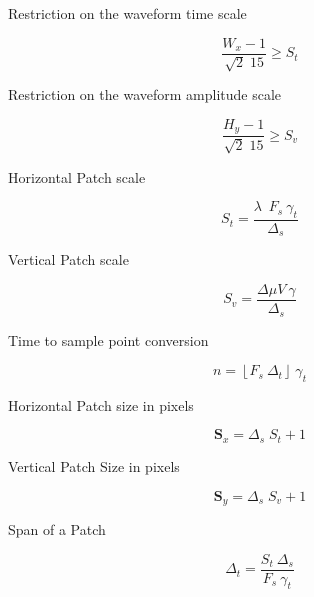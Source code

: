 Restriction on the waveform time scale

\begin{equation}
\frac{W_x-1}{\sqrt{2} \; 15}  \geq S_t 
\label{eq:restriction1}
\end{equation}

Restriction on the waveform amplitude scale

\begin{equation}
\frac{H_y-1}{\sqrt{2} \; 15}  \geq S_v 
\label{eq:restriction2}
\end{equation}

Horizontal Patch scale

\begin{equation}
S_t = \frac{ \lambda \;  \  F_s \ \gamma_t }{\Delta_s}
\label{eq:mapping2}
\end{equation}

Vertical Patch scale

\begin{equation}
S_v= \frac{\Delta \mu V \ \gamma}{\Delta_s} 
\label{eq:mapping1}
\end{equation}

Time to sample point conversion

\begin{equation}
n = \left\lfloor F_s \ \Delta_t \right\rfloor \ \gamma_t
\label{eq:mapping1}
\end{equation}

Horizontal Patch size in pixels

\begin{equation}
\mathbf{S}_x = \Delta_s \; S_t + 1
\label{eq:mapping2}
\end{equation}

Vertical Patch Size in pixels

\begin{equation}
\mathbf{S}_y = \Delta_s \; S_v + 1
\label{eq:mapping1}
\end{equation}

Span of a Patch

\begin{equation}
\Delta_t = \frac{S_t \ \Delta_s}{F_s \ \gamma_t} 
\label{eq:mapping1}
\end{equation}
